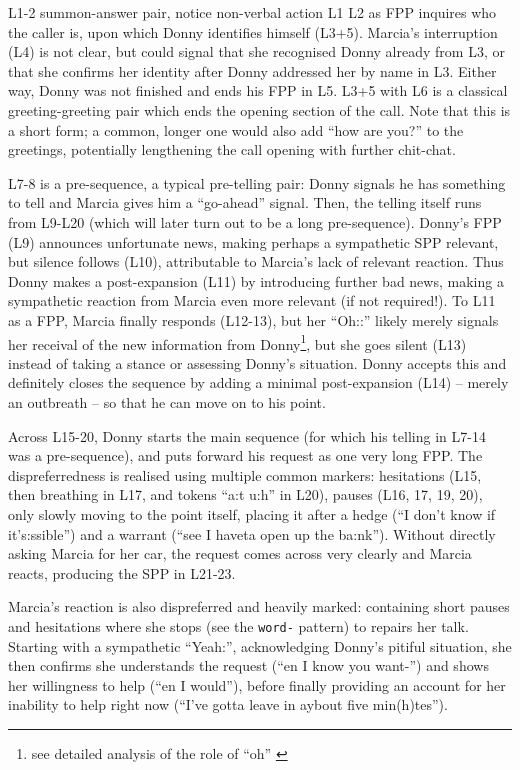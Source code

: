 \documentclass[11pt]{article}
\begin{document}
{	L1-2 summon-answer pair, notice non-verbal action L1
	L2 as FPP inquires who the caller is, upon which Donny identifies himself (L3+5).
	Marcia's interruption (L4) is not clear, but could signal that she recognised Donny already from L3, or that she confirms her identity after Donny addressed her by name in L3. Either way, Donny was not finished and ends his FPP in L5.
	L3+5 with L6 is a classical greeting-greeting pair which ends the opening section of the call. Note that this is a short form; a common, longer one would also add ``how are you?'' to the greetings, potentially lengthening the call opening with further chit-chat.

	L7-8 is a pre-sequence, a typical pre-telling pair: Donny signals he has something to tell and Marcia gives him a ``go-ahead'' signal. Then, the telling itself runs from L9-L20 (which will later turn out to be a long pre-sequence). Donny's FPP (L9) announces unfortunate news, making perhaps a sympathetic SPP relevant, but silence follows (L10), attributable to Marcia's lack of relevant reaction. Thus Donny makes a post-expansion (L11) by introducing further bad news, making a sympathetic reaction from Marcia even more relevant (if not required!). To L11 as a FPP, Marcia finally responds (L12-13), but her ``Oh::'' likely merely signals her receival of the new information from Donny\footnote{see detailed analysis of the role of ``oh'' \citep{Heritage_1984}}, but she goes silent (L13) instead of taking a stance or assessing Donny's situation. Donny accepts this and definitely closes the sequence by adding a minimal post-expansion (L14) -- merely an outbreath -- so that he can move on to his point.

	Across L15-20, Donny starts the main sequence (for which his telling in L7-14 was a pre-sequence), and puts forward his request as one very long FPP. The dispreferredness is realised using multiple common markers: hesitations (L15, then breathing in L17, and tokens ``a:t u:h'' in L20), pauses (L16, 17, 19, 20), only slowly moving to the point itself, placing it after a hedge (``I don't know if it's:ssible'') and a warrant (``see I haveta open up the ba:nk''). Without directly asking Marcia for her car, the request comes across very clearly and Marcia reacts, producing the SPP in L21-23.

	Marcia's reaction is also dispreferred and heavily marked: containing short pauses and hesitations where she stops (see the \verb|word-| pattern) to repairs her talk. Starting with a sympathetic ``Yeah:'', acknowledging Donny's pitiful situation, she then confirms she understands the request (``en I know you want-'') and shows her willingness to help (``en I would''), before finally providing an account for her inability to help right now (``I've gotta leave in aybout five min(h)tes'').

}
\end{document}
